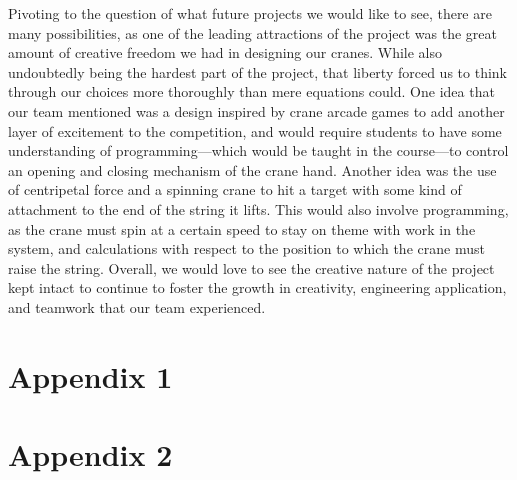 \documentclass[letterpaper, 12pt]{article}
\begin{document}
Pivoting to the question of what future projects we would like to see, there are many possibilities, as one of the leading attractions of the project was the great amount of creative freedom we had in designing our cranes. 
While also undoubtedly being the hardest part of the project, that liberty forced us to think through our choices more thoroughly than mere equations could. 
One idea that our team mentioned was a design inspired by crane arcade games to add another layer of excitement to the competition, and would require students to have some understanding of programming—which would be taught in the course—to control an opening and closing mechanism of the crane hand. 
Another idea was the use of centripetal force and a spinning crane to hit a target with some kind of attachment to the end of the string it lifts. 
This would also involve programming, as the crane must spin at a certain speed to stay on theme with work in the system, and calculations with respect to the position to which the crane must raise the string. 
Overall, we would love to see the creative nature of the project kept intact to continue to foster the growth in creativity, engineering application, and teamwork that our team experienced.

\section*{Appendix 1}













\section*{Appendix 2}
\end{document}
